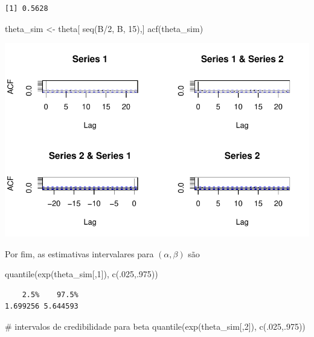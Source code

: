 \documentclass[
  letterpaper,
  DIV=11,
  numbers=noendperiod]{scrreprt}
\newenvironment{Shaded}{\begin{snugshade}}{\end{snugshade}}
\newcommand{\CommentTok}[1]{\textcolor[rgb]{0.37,0.37,0.37}{#1}}
\newcommand{\DecValTok}[1]{\textcolor[rgb]{0.68,0.00,0.00}{#1}}
\newcommand{\FunctionTok}[1]{\textcolor[rgb]{0.28,0.35,0.67}{#1}}
\newcommand{\NormalTok}[1]{\textcolor[rgb]{0.00,0.23,0.31}{#1}}
\newcommand{\OtherTok}[1]{\textcolor[rgb]{0.00,0.23,0.31}{#1}}
\newcommand{\SpecialCharTok}[1]{\textcolor[rgb]{0.37,0.37,0.37}{#1}}
\theoremstyle{plain}
\theoremstyle{definition}
\theoremstyle{definition}
\theoremstyle{remark}
\begin{document}
\begin{verbatim}
[1] 0.5628
\end{verbatim}

\begin{Shaded}
\begin{Highlighting}[]
\NormalTok{theta\_sim }\OtherTok{\textless{}{-}}\NormalTok{ theta[ }\FunctionTok{seq}\NormalTok{(B}\SpecialCharTok{/}\DecValTok{2}\NormalTok{, B, }\DecValTok{15}\NormalTok{),]}
\FunctionTok{acf}\NormalTok{(theta\_sim)}
\end{Highlighting}
\end{Shaded}

\includegraphics{aproximacaoNormal_files/figure-pdf/unnamed-chunk-8-1.pdf}

Por fim, as estimativas intervalares para \((\alpha,\beta)\) são

\begin{Shaded}
\begin{Highlighting}[]
\FunctionTok{quantile}\NormalTok{(}\FunctionTok{exp}\NormalTok{(theta\_sim[,}\DecValTok{1}\NormalTok{]), }\FunctionTok{c}\NormalTok{(.}\DecValTok{025}\NormalTok{,.}\DecValTok{975}\NormalTok{))}
\end{Highlighting}
\end{Shaded}

\begin{verbatim}
    2.5%    97.5% 
1.699256 5.644593 
\end{verbatim}

\begin{Shaded}
\begin{Highlighting}[]
\CommentTok{\# intervalos de credibilidade para beta}
\FunctionTok{quantile}\NormalTok{(}\FunctionTok{exp}\NormalTok{(theta\_sim[,}\DecValTok{2}\NormalTok{]), }\FunctionTok{c}\NormalTok{(.}\DecValTok{025}\NormalTok{,.}\DecValTok{975}\NormalTok{))}
\end{Highlighting}
\end{Shaded}
\end{document}
